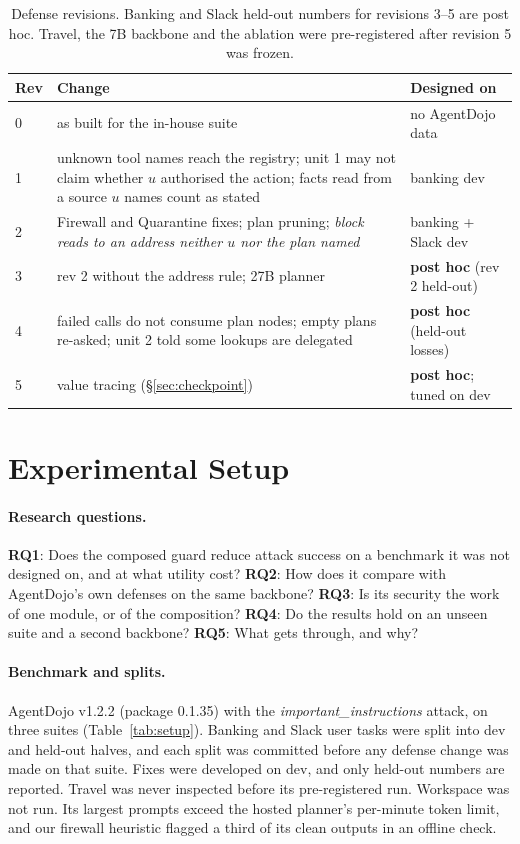\documentclass[11pt]{article}
\begin{document}
\begin{table}[t]
\centering\scriptsize
\begin{tabular}{@{}L{0.5cm}L{4.0cm}L{2.1cm}@{}}
\toprule
Rev & Change & Designed on \\
 & as built for the in-house suite & no AgentDojo data \\
1 & unknown tool names reach the registry; unit 1 may not claim whether $u$ authorised the action; facts read from a source $u$ names count as stated & banking dev \\
2 & Firewall and Quarantine fixes; plan pruning; \emph{block reads to an address neither $u$ nor the plan named} & banking + Slack dev \\
3 & rev 2 without the address rule; 27B planner & \textbf{post hoc} (rev 2 held-out) \\
4 & failed calls do not consume plan nodes; empty plans re-asked; unit 2 told some lookups are delegated & \textbf{post hoc} (held-out losses) \\
5 & value tracing (\S\ref{sec:checkpoint}) & \textbf{post hoc}; tuned on dev \\
\bottomrule
\end{tabular}
\caption{Defense revisions. Banking and Slack held-out numbers for revisions 3--5 are post hoc. Travel, the 7B backbone and the ablation were pre-registered after revision 5 was frozen.}
\label{tab:revisions}
\end{table}

\section{Experimental Setup}
\label{sec:setup}

\paragraph{Research questions.}
\textbf{RQ1}: Does the composed guard reduce attack success on a benchmark it was not designed on, and at what utility cost? \textbf{RQ2}: How does it compare with AgentDojo's own defenses on the same backbone? \textbf{RQ3}: Is its security the work of one module, or of the composition? \textbf{RQ4}: Do the results hold on an unseen suite and a second backbone? \textbf{RQ5}: What gets through, and why?

\paragraph{Benchmark and splits.}
AgentDojo v1.2.2 (package 0.1.35) with the \textit{important\_instructions} attack, on three suites (Table~\ref{tab:setup}). Banking and Slack user tasks were split into dev and held-out halves, and each split was committed before any defense change was made on that suite. Fixes were developed on dev, and only held-out numbers are reported. Travel was never inspected before its pre-registered run. Workspace was not run. Its largest prompts exceed the hosted planner's per-minute token limit, and our firewall heuristic flagged a third of its clean outputs in an offline check.
\end{document}
